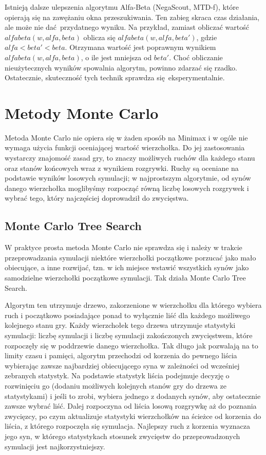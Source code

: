 \documentclass{pracamgr}
\begin{document}
Istnieją dalsze ulepszenia algorytmu Alfa-Beta (NegaScout, MTD-f), które opierają się na zawężaniu okna przeszukiwania.
Ten zabieg skraca czas działania, ale może nie dać przydatnego wyniku.
Na przykład, zamiast obliczać wartość \(alfabeta(w, alfa, beta)\) oblicza się \(alfabeta(w, alfa, beta')\), gdzie \(alfa < beta' < beta\).
Otrzymana wartość jest poprawnym wynikiem \(alfabeta(w, alfa, beta)\), o ile jest mniejsza od \(beta'\).
Choć obliczanie nieużytecznych wyników spowalnia algorytm, powinno zdarzać się rzadko.
Ostatecznie, skuteczność tych technik sprawdza się eksperymentalnie.

\section{Metody Monte Carlo}

Metoda Monte Carlo nie opiera się w żaden sposób na Minimax i w ogóle nie wymaga użycia funkcji oceniającej wartość wierzchołka.
Do jej zastosowania wystarczy znajomość zasad gry, to znaczy możliwych ruchów dla każdego stanu oraz stanów końcowych wraz z wynikiem rozgrywki.
Ruchy są oceniane na podstawie wyników losowych symulacji; w najprostszym algorytmie, od synów danego wierzchołka moglibyśmy rozpocząć równą liczbę losowych rozgrywek i wybrać tego, który najczęściej doprowadził do zwycięstwa.

\subsection{Monte Carlo Tree Search}

W praktyce prosta metoda Monte Carlo nie sprawdza się i należy w trakcie przeprowadzania symulacji niektóre wierzchołki początkowe porzucać jako mało obiecujące, a inne rozwijać, tzn. w ich miejsce wstawić wszystkich synów jako samodzielne wierzchołki początkowe symulacji.
Tak działa Monte Carlo Tree Search.

Algorytm ten utrzymuje drzewo, zakorzenione w wierzchołku dla którego wybiera ruch i początkowo posiadające ponad to wyłącznie liść dla każdego możliwego kolejnego stanu gry.
Każdy wierzchołek tego drzewa utrzymuje statystyki symulacji: liczbę symulacji i liczbę symulacji zakończonych zwycięstwem, które rozpoczęły się w poddrzewie danego wierzchołka.
Tak długo jak pozwalają na to limity czasu i pamięci, algorytm przechodzi od korzenia do pewnego liścia wybierając zawsze najbardziej obiecującego syna w zależności od wcześniej zebranych statystyk. Na podstawie statystyk liścia podejmuje decyzję o rozwinięciu go (dodaniu możliwych kolejnych stanów gry do drzewa ze statystykami) i jeśli to zrobi, wybiera jednego z dodanych synów, aby ostatecznie zawsze wybrać liść.
Dalej rozpoczyna od liścia losową rozgrywkę aż do poznania zwycięzcy, po czym aktualizuje statystyki wierzchołków na ścieżce od korzenia do liścia, z którego rozpoczęła się symulacja.
Najlepszy ruch z korzenia wyznacza jego syn, w którego statystykach stosunek zwycięstw do przeprowadzonych symulacji jest najkorzystniejszy.
\end{document}
